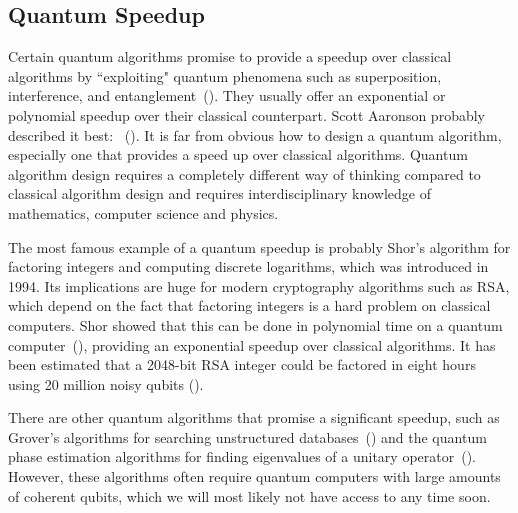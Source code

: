 \documentclass[a4paper,10pt]{article}
\begin{document}
\subsection{Quantum Speedup}
Certain quantum algorithms promise to provide a speedup over classical algorithms by ``exploiting" quantum phenomena such as superposition, interference, and entanglement~(\cite{nielsen-chuang}).
They usually offer an exponential or polynomial speedup over their classical counterpart.
Scott Aaronson probably described it best:
~(\cite{scott-aaronson-qc}).
It is far from obvious how to design a quantum algorithm, especially one that provides a speed up over classical algorithms.
Quantum algorithm design requires a completely different way of thinking compared to classical algorithm design and requires interdisciplinary knowledge of mathematics, computer science and physics.

The most famous example of a quantum speedup is probably Shor's algorithm for factoring integers and computing discrete logarithms, which was introduced in 1994.
Its implications are huge for modern cryptography algorithms such as RSA, which depend on the fact that factoring integers is a hard problem on classical computers.
Shor showed that this can be done in polynomial time on a quantum computer~(\cite{shor-factoring}), providing an exponential speedup over classical algorithms. 
It has been estimated that a 2048-bit RSA integer could be factored in eight hours using 20 million noisy qubits (\cite{shor-20mil}).

There are other quantum algorithms that promise a significant speedup, such as Grover's algorithms for searching unstructured databases~(\cite{grover-search}) and the quantum phase estimation algorithms for finding eigenvalues of a unitary operator~(\cite{nielsen-chuang}).
However, these algorithms often require quantum computers with large amounts of coherent qubits, which we will most likely not have access to any time soon.
\end{document}
